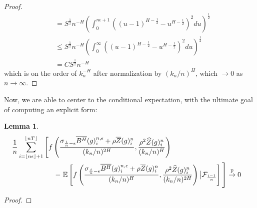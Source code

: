 \documentclass[12pt,letterpaper]{article}
\newtheorem{lemma}{Lemma}
\theoremstyle{definition}
\newcommand{\E}{\mathbb{E}}
\begin{document}
\begin{proof}
\begin{align}
                                                                                                   &= S^{\frac{1}{2}}n^{-H}\left(\int^{n\epsilon+1}_0\left(\left(u - 1\right)^{H-\frac{1}{2}} -  u^{H-\frac{1}{2}}\right)^2 du\right)^{\frac{1}{2}} \\
                                                                                                   &\leq S^{\frac{1}{2}}n^{-H}\left(\int^{\infty}_0\left(\left(u - 1\right)^{H-\frac{1}{2}} -  u^{H-\frac{1}{2}}\right)^2 du\right)^{\frac{1}{2}} \\
                                                                                                   &= CS^{\frac{1}{2}}n^{-H}
  \end{align}
  which is on the order of \(k_{n}^{-H}\) after normalization by \((k_{n}/n)^{H}\), which \(\rightarrow 0\) as \(n \rightarrow \infty\).
\end{proof}

Now, we are able to center to the conditional expectation, with the ultimate goal of computing an explicit form:
\begin{lemma}
  \begin{align}
    \phantom{}
    &\begin{aligned}
      \mathllap{} &\frac{1}{n}\sum_{i = \left\lfloor n\epsilon \right\rfloor + 1}^{\left\lfloor nT \right\rfloor} \left[ \vphantom{\E \left[ f\left( \frac{\sigma_{\frac{i}{n}-\epsilon}\overline{B^H}(g)^{n,\epsilon}_i + \rho\overline{Z}(g)^n_i}{(k_n/n)^{2H}}, \frac{\rho^2\widehat{Z}(g)^n_i}{(k_n/n)^H}\right) \right] } f\left( \frac{\sigma_{\frac{i}{n}-\epsilon}\overline{B^H}(g)^{n,\epsilon}_i + \rho\overline{Z}(g)^n_i}{(k_n/n)^{2H}}, \frac{\rho^2\widehat{Z}(g)^n_i}{(k_n/n)^H}\right) \right. \\ &\hspace*{2.1cm} - \left. \E\left[ f\left( \frac{\sigma_{\frac{i}{n}-\epsilon}\overline{B^H}(g)^{n,\epsilon}_i + \rho\overline{Z}(g)^n_i}{(k_n/n)^{H}}, \frac{\rho^2\widehat{Z}(g)^n_i}{(k_n/n)^{2H}}\right) \big| \mathcal{F}_{\frac{i-1}{n}} \right] \vphantom{\frac{1}{n}\sum_{i = \left\lfloor n\epsilon \right\rfloor + 1}^{\left\lfloor nT \right\rfloor}} \right] \overset{\mathbb{P}}{\rightarrow} 0
    \end{aligned}
  \end{align}
\end{lemma}

\begin{proof}
\end{proof}
\end{document}
